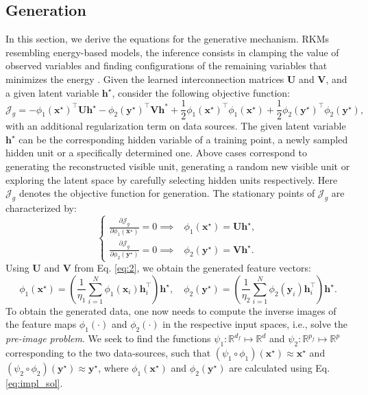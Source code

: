 \documentclass[preview,border=0.3pt]{standalone}
\begin{document}
\subsection{Generation}
%
In this section, we derive the equations for the generative mechanism. RKMs resembling energy-based models, the inference consists in clamping the value of observed variables and finding configurations of the remaining variables that minimizes the energy  \cite{lecun_learning_2004}. Given the learned interconnection matrices $\bm U$ and $\bm V$, and a given latent variable $\bm{h}^{\star}$, consider the following objective function:
%
\begin{equation}\label{eq:obj_gen_lin}
    {\mathcal{J}_{g}= - \phi_{1}(\bm{x}^{\star})^{\top}\bm{U}\bm{h}^{\star} - \phi_{2}(\bm{y}^{\star})^{\top}\bm{V} \bm{h}^{*} + \dfrac{1}{2}\phi_{1}(\bm{x}^{\star})^{\top}\phi_{1}(\bm{x}^{\star}) + \dfrac{1}{2}\phi_{2}(\bm{y}^{\star})^{\top}\phi_{2}(\bm{y}^{\star})},
\end{equation}
with an additional regularization term on data sources. The given latent variable $\bm{h}^{\star}$ can be the corresponding hidden variable of a training point, a newly sampled hidden unit or a specifically determined one. Above cases correspond to generating the reconstructed visible unit, generating a random new visible unit or exploring the latent space by carefully selecting hidden units respectively.
Here ${\mathcal{J}_{g}}$ denotes the objective function for generation.
%
The stationary points of $\mathcal{J}_{g}$ are characterized by:
%
\begin{equation}\label{eq:statio_pred}
    \begin{cases}
        \frac{\partial \mathcal{J}_{g}}{\partial \phi_{1}(\bm{x}^{\star})}=0     \implies  & \phi_{1}(\bm{x}^{\star}) = \bm{U}\bm{h}^{\star}, \\
        \frac{\partial \mathcal{J}_{g}}{\partial \phi_{2}(\bm{y}^{\star})} =0     \implies & \phi_{2}(\bm{y}^{\star}) = \bm{V}\bm{h}^{\star}.
    \end{cases}
\end{equation}
%
Using $\bm{U}$ and $\bm V$ from Eq. \ref{eq:2}, we obtain the generated feature vectors:
%
\begin{equation}\label{eq:impl_sol}
    {\phi}_{1}(\bm{x}^{\star}) = \left(\dfrac{1}{\eta_{1}} \sum_{i=1}^{N}{\phi}_{1}(\bm{x}_i)\bm{h}_{i}^\top\right) \bm{h}^{\star},
    \quad
    {\phi}_{2}(\bm{y}^{\star}) = \left(\dfrac{1}{\eta_{2}} \sum_{i=1}^{N}{\phi}_{2}(\bm{y}_i)\bm{h}_{i}^\top\right) \bm{h}^{\star}.
\end{equation}
%
%
%
%
To obtain the generated data, one now needs to compute the inverse images of the feature maps $\phi_{1}(\cdot)$ and $\phi_{2}(\cdot)$ in the respective input spaces, i.e., solve the \emph{pre-image problem}. We seek to find the functions $\psi_1 \colon \mathbb{R}^{d_f}  \mapsto \mathbb{R}^{d}$ and $\psi_2 \colon \mathbb{R}^{p_f}  \mapsto \mathbb{R}^p$ corresponding to the two data-sources, such that $(\psi_1 \circ \phi_1) (\bm{x}^\star)\approx \bm{x}^\star$ and $(\psi_2 \circ \phi_2) (\bm{y}^\star) \approx \bm{y}^\star$, where $\phi_1 (\bm{x}^\star)$ and $\phi_2 (\bm{y}^\star)$ are calculated using Eq. \ref{eq:impl_sol}.
\end{document}
